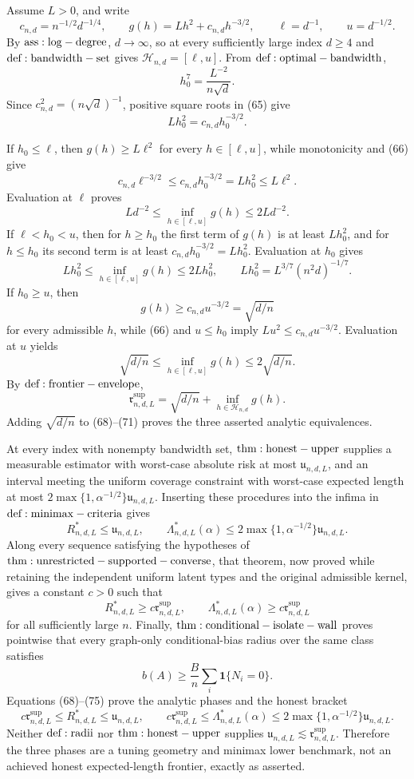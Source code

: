 Assume \(L>0\), and write
\[
 c_{n,d}=n^{-1/2}d^{-1/4},
 \qquad
 g(h)=Lh^2+c_{n,d}h^{-3/2},
 \qquad
 \ell=d^{-1},
 \qquad
 u=d^{-1/2}.
\tag{64}
\]
By \({\rm ass:log-degree}\), \(d\to\infty\), so at every sufficiently large index \(d\ge4\) and \({\rm def:bandwidth-set}\) gives \(\mathcal H_{n,d}=[\ell,u]\).  From \({\rm def:optimal-bandwidth}\),
\[
 h_0^7=\frac{L^{-2}}{n\sqrt d}.
\tag{65}
\]
Since \(c_{n,d}^2=(n\sqrt d)^{-1}\), positive square roots in (65) give
\[
 Lh_0^2=c_{n,d}h_0^{-3/2}.
\tag{66}
\]

If \(h_0\leq\ell\), then \(g(h)\geq L\ell^2\) for every \(h\in[\ell,u]\), while monotonicity and (66) give
\[
 c_{n,d}\ell^{-3/2}
 \leq c_{n,d}h_0^{-3/2}
 =Lh_0^2\leq L\ell^2.
\tag{67}
\]
Evaluation at \(\ell\) proves
\[
 Ld^{-2}\leq\inf_{h\in[\ell,u]}g(h)\leq2Ld^{-2}.
\tag{68}
\]
If \(\ell<h_0<u\), then for \(h\geq h_0\) the first term of \(g(h)\) is at least \(Lh_0^2\), and for \(h\leq h_0\) its second term is at least \(c_{n,d}h_0^{-3/2}=Lh_0^2\).  Evaluation at \(h_0\) gives
\[
 Lh_0^2\leq\inf_{h\in[\ell,u]}g(h)\leq2Lh_0^2,
 \qquad
 Lh_0^2=L^{3/7}(n^2d)^{-1/7}.
\tag{69}
\]
If \(h_0\geq u\), then
\[
 g(h)\geq c_{n,d}u^{-3/2}=\sqrt{d/n}
\tag{70}
\]
for every admissible \(h\), while (66) and \(u\leq h_0\) imply \(Lu^2\leq c_{n,d}u^{-3/2}\).  Evaluation at \(u\) yields
\[
 \sqrt{d/n}\leq\inf_{h\in[\ell,u]}g(h)\leq2\sqrt{d/n}.
\tag{71}
\]
By \({\rm def:frontier-envelope}\),
\[
 \mathfrak r^{\mathrm{sup}}_{n,d,L}
 =\sqrt{d/n}+\inf_{h\in\mathcal H_{n,d}}g(h).
\tag{72}
\]
Adding \(\sqrt{d/n}\) to (68)--(71) proves the three asserted analytic equivalences.

At every index with nonempty bandwidth set, \({\rm thm:honest-upper}\) supplies a measurable estimator with worst-case absolute risk at most \(\mathfrak u_{n,d,L}\), and an interval meeting the uniform coverage constraint with worst-case expected length at most \(2\max\{1,\alpha^{-1/2}\}\mathfrak u_{n,d,L}\).  Inserting these procedures into the infima in \({\rm def:minimax-criteria}\) gives
\[
 R^*_{n,d,L}\leq\mathfrak u_{n,d,L},
 \qquad
 \Lambda^*_{n,d,L}(\alpha)
 \leq2\max\{1,\alpha^{-1/2}\}\mathfrak u_{n,d,L}.
\tag{73}
\]
Along every sequence satisfying the hypotheses of \({\rm thm:unrestricted-supported-converse}\), that theorem, now proved while retaining the independent uniform latent types and the original admissible kernel, gives a constant \(c>0\) such that
\[
 R^*_{n,d,L}\geq c\mathfrak r^{\mathrm{sup}}_{n,d,L},
 \qquad
 \Lambda^*_{n,d,L}(\alpha)\geq c\mathfrak r^{\mathrm{sup}}_{n,d,L}
\tag{74}
\]
for all sufficiently large \(n\).  Finally, \({\rm thm:conditional-isolate-wall}\) proves pointwise that every graph-only conditional-bias radius over the same class satisfies
\[
 b(A)\geq\frac Bn\sum_i\mathbf1\{N_i=0\}.
\tag{75}
\]
Equations (68)--(75) prove the analytic phases and the honest bracket
\[
 c\mathfrak r^{\mathrm{sup}}_{n,d,L}
 \leq R^*_{n,d,L}\leq\mathfrak u_{n,d,L},
 \qquad
 c\mathfrak r^{\mathrm{sup}}_{n,d,L}
 \leq\Lambda^*_{n,d,L}(\alpha)
 \leq2\max\{1,\alpha^{-1/2}\}\mathfrak u_{n,d,L}.
\tag{76}
\]
Neither \({\rm def:radii}\) nor \({\rm thm:honest-upper}\) supplies \(\mathfrak u_{n,d,L}\lesssim\mathfrak r^{\mathrm{sup}}_{n,d,L}\).  Therefore the three phases are a tuning geometry and minimax lower benchmark, not an achieved honest expected-length frontier, exactly as asserted.